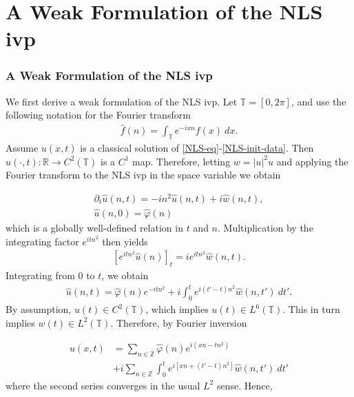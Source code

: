 \documentclass[handout]{beamer}
\numberwithin{equation}{section}
\newcommand{\rr}{\mathbb{R}}
\newcommand{\p}{\partial}
\newcommand{\zz}{\mathbb{Z}}
\newcommand{\ci}{\mathbb{T}}
\newcommand{\wh}{\widehat}
\newcommand{\vp}{\varphi}
\begin{document}
\section{A Weak Formulation of the NLS ivp}
\begin{frame}
	\frametitle{A Weak Formulation of the NLS ivp}
We first derive a weak formulation of the NLS ivp. 
Let $\ci = [0, 2 \pi]$, and use
the following notation for the Fourier transform
%
%
%
%
\begin{equation*}
	\begin{split}
		\widehat{f}(n) = \int_{\ci} e^{-ix n} f(x) \ dx.
	\end{split}
\end{equation*}
Assume 
$u(x,t)$ is a classical solution of \eqref{NLS-eq}-\eqref{NLS-init-data}.
Then $u(\cdot ,   t): \rr \to C^{2}(\ci)$ is a $C^1$ map. Therefore, letting 
$w = | u |^2 u$ and applying 
the Fourier transform to the NLS ivp in the space variable we obtain 
%
%
\end{frame}

\begin{frame}
\begin{gather*}
	\p_t \widehat{u}(n, t) = -i n^2 \widehat{u}(n, t) + i  
	\widehat{w} (n, t),
	\\
	\widehat{u} (n,0) = \widehat{\vp}(n)
\end{gather*}
%
%
which is a globally well-defined relation in $t$ 
and $n$. Multiplication by the integrating factor $e^{itn^{2}}$ then yields
\begin{equation*}
	\begin{split}
		\left[ e^{it n^{2}} \widehat{u}(n) \right]_t = i
		 e^{it n^{2}} \widehat{w} (n, t).	
	\end{split}
\end{equation*}
%
%
Integrating from $0$ to $t$, we obtain
%
%
\begin{equation*}
	\begin{split}
		\wh{u}(n, t) = \wh{\vp}(n) e^{-it n^{2}} + i  
		\int_0^t e^{i(t' - t)n^{2}} \wh{w}(n, t') \ 
		dt'.
	\end{split}
\end{equation*}
%
%
By assumption, $u(t) \in C^2(\ci)$, which implies $u(t) \in L^6(\ci)$. This 
in turn implies $w(t) \in L^2(\ci)$. Therefore, by Fourier inversion 
%
%
\end{frame}

\begin{frame}
\begin{equation}
	\label{NLS-integral-form}
	\begin{split}
		u(x,t) & = \sum_{n \in \zz} \wh{\vp}(n) e^{i\left( xn - t n^{2} 
		\right)} 
		\\
		& + i \sum_{n \in \zz} \int_0^t e^{i\left[ xn + \left( t' - t 
		\right)n^{2} \right]} \wh{w}(n, t') \ dt'
	\end{split}
\end{equation}
%
%
where the second series converges in the usual $L^2$ sense.
%
%
Hence, 
\end{frame}
\end{document}
